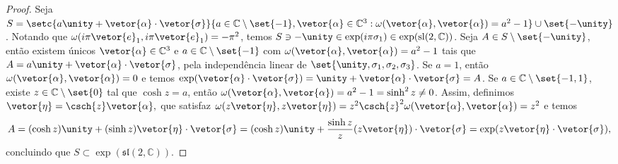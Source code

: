 \begin{proof}
    Seja \(S = \setc{a\unity + \vetor{\alpha}\cdot\vetor{\sigma}}{a \in \mathbb{C}\setminus\set{-1}, \vetor{\alpha} \in \mathbb{C}^3 : \omega(\vetor{\alpha}, \vetor{\alpha})= a^2 - 1}\cup\set{-\unity}\). Notando que \(\omega(i\pi\vetor{e}_1, i\pi \vetor{e}_1) = -\pi^2\), temos \(S \ni -\unity \in \exp(i\pi \sigma_1) \in \exp(\mathrm{sl}(2,\mathbb{C}))\). Seja \(A \in S \setminus \set{-\unity}\), então existem únicos \(\vetor{\alpha} \in \mathbb{C}^3\) e \(a \in \mathbb{C}\setminus\set{-1}\) com \(\omega(\vetor{\alpha}, \vetor{\alpha}) = a^2 - 1\) tais que \(A = a \unity + \vetor{\alpha}\cdot{\vetor{\sigma}}\), pela independência linear de \(\set{\unity, \sigma_1, \sigma_2, \sigma_3}\).  Se \(a = 1\), então \(\omega(\vetor{\alpha},\vetor{\alpha}) = 0\) e temos \(\exp(\vetor{\alpha}\cdot\vetor{\sigma}) = \unity + \vetor{\alpha}\cdot\vetor{\sigma} = A\). Se \(a \in \mathbb{C} \setminus\set{-1, 1}\), existe \(z\in \mathbb{C}\setminus\set{0}\) tal que \(\cosh{z} = a\), então \(\omega(\vetor{\alpha}, \vetor{\alpha}) = a^2 - 1 = \sinh^2{z} \neq 0\). Assim, definimos \(\vetor{\eta} = \csch{z} \vetor{\alpha},\) que satisfaz \(\omega(z\vetor{\eta},z\vetor{\eta}) = z^2\csch{z}^2 \omega(\vetor{\alpha}, \vetor{\alpha}) = z^2\) e temos
    \begin{equation*}
        A = (\cosh{z})\unity + (\sinh{z}) \vetor{\eta}\cdot \vetor{\sigma} = (\cosh{z})\unity + \frac{\sinh{z}}{z}(z\vetor{\eta})\cdot \vetor{\sigma} = \exp(z \vetor{\eta}\cdot \vetor{\sigma}),
    \end{equation*}
    concluindo que \(S \subset \exp(\mathfrak{sl}(2,\mathbb{C}))\).


\end{proof}
